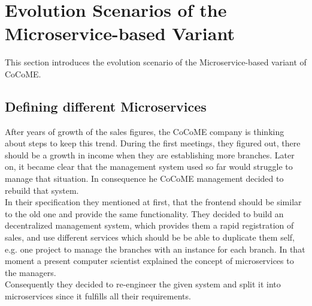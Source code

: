 \newpage

\section{Evolution Scenarios of the Microservice-based Variant}
This section introduces the evolution scenario of the Microservice-based variant of
CoCoME.
\subsection{Defining different Microservices}
After years of growth of the sales figures, the CoCoME company is thinking about steps to keep this trend. During the first meetings, they figured out, there should be a growth in income when they are establishing more branches. Later on, it became clear that the management system used so far would struggle to manage that situation. In consequence he CoCoME management decided to rebuild that system.\\
In their specification they mentioned at first, that the frontend should be similar to the old one and provide the same functionality. They decided to build an decentralized management system, which provides them a rapid registration of sales, and use different services which should be be able to duplicate them self, e.g. one project to manage the branches with an instance for each branch. In that moment a present computer scientist explained the concept of microservices to the managers.\\
Consequently they decided to re-engineer the given system and split it into microservices since it fulfills all their requirements. 

	
	
